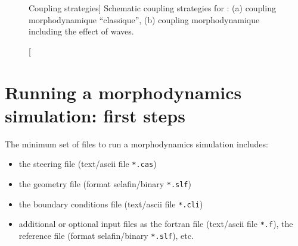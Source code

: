 \begin{figure}[H]%
\begin{center}
%
\hfil
%
%
\hfil
%
%
\hfil
\mbox{}
\end{center}
\caption
[Coupling strategies]
{Schematic coupling strategies for \sisyphe: (a) coupling morphodynamique ``classique'', (b) coupling morphodynamique including the effect of waves.}
\label{fig:CouplingStrategies}
\end{figure}

\pagebreak

\section{Running a morphodynamics simulation: first steps}
The minimum set of files to run a morphodynamics simulation includes:
\begin{itemize}
\item the steering file (text/ascii file \texttt{*.cas})
\item the geometry file (format selafin/binary \texttt{*.slf})
\item the boundary conditions file (text/ascii file \texttt{*.cli})
\item additional or optional input files as the fortran file (text/ascii file \texttt{*.f}), the reference file (format selafin/binary \texttt{*.slf}), etc.
\end{itemize}

